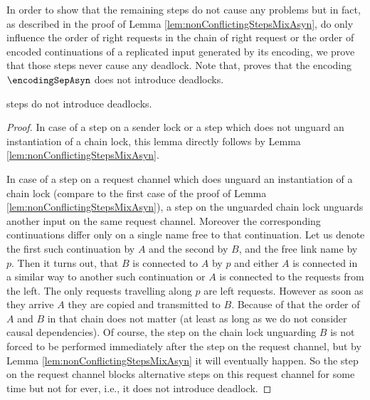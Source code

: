 \documentclass[]{llncs}
\begin{document}
In order to show that the remaining \pure \admin steps do not cause any problems but in fact, as described in the proof of Lemma \ref{lem:nonConflictingStepsMixAsyn}, do only influence the order of right requests in the chain of right request or the order of encoded continuations of a replicated input generated by its encoding, we prove that those steps never cause any deadlock. Note that, \cite{nestmann00} proves that the encoding $ \encodingSepAsyn $ does not introduce deadlocks.

\begin{lemma} \label{lem:pureAdminStepsNoDeadlock}
	\Pure \admin steps do not introduce deadlocks.
\end{lemma}

\begin{proof}
	In case of a step on a sender lock or a step which does not unguard an instantiation of a chain lock, this lemma directly follows by Lemma \ref{lem:nonConflictingStepsMixAsyn}.
	
	In case of a step on a request channel which does unguard an instantiation of a chain lock (compare to the first case of the proof of Lemma \ref{lem:nonConflictingStepsMixAsyn}), a step on the unguarded chain lock unguards another input on the same request channel. Moreover the corresponding continuations differ only on a single name free to that continuation. Let us denote the first such continuation by $ A $ and the second by $ B $, and the free link name by $ p $. Then it turns out, that $ B $ is connected to $ A $ by $ p $ and either $ A $ is connected in a similar way to another such continuation or $ A $ is connected to the requests from the left. The only requests travelling along $ p $ are left requests. However as soon as they arrive $ A $ they are copied and transmitted to $ B $. Because of that the order of $ A $ and $ B $ in that chain does not matter (at least as long as we do not consider causal dependencies). Of course, the step on the chain lock unguarding $ B $ is not forced to be performed immediately after the step on the request channel, but by Lemma \ref{lem:nonConflictingStepsMixAsyn} it will eventually happen. So the step on the request channel blocks alternative steps on this request channel for some time but not for ever, i.e., it does not introduce deadlock.
	

\end{proof}
\end{document}
